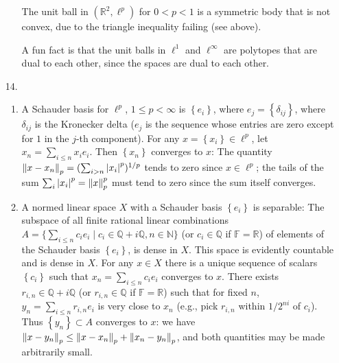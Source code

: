 \documentclass[11pt,leqno]{article}
\theoremstyle{plain}
\theoremstyle{definition}
\numberwithin{equation}{section}
\numberwithin{lem}{section}
\newcommand{\cbr}[1]{\left\{#1\right\}}
\begin{document}
\begin{enumerate}
\begin{enumerate}
    The unit ball in $(\mathbb R^2,\ell^p)$ for $0<p<1$ is a symmetric body that is not convex, due to the triangle inequality failing (see above).

    A fun fact is that the unit balls in $\ell^1$ and $\ell^\infty$ are polytopes that are dual to each other, since the spaces are dual to each other.
  \end{enumerate}\newpage
  
  \item[14.]
  \begin{enumerate}
      \item A Schauder basis for $\ell^p$, $1\leq p<\infty$ is $\cbr{e_i}$, where $e_j = \cbr{\delta_{ij}}$, where $\delta_{ij}$ is the Kronecker delta ($e_j$ is the sequence whose entries are zero except for $1$ in the $j$-th component). For any $x = \cbr{x_i}\in \ell^p$, let $x_n = \sum_{i\leq n} x_ie_i$. Then $\cbr{x_n}$ converges to $x$: The quantity $\norm{x-x_n}_p = (\sum_{i>n}\abs{x_i}^p)^{1/p}$ tends to zero since $x\in \ell^p$; the tails of the sum $\sum_i\abs{x_i}^p = \norm{x}_p^p$ must tend to zero since the sum itself converges.

      \item A normed linear space $X$ with a Schauder basis $\cbr{e_i}$ is separable: The subspace of all finite rational linear combinations $A = \{\sum_{i\leq n}c_ie_i\mid c_i\in \mathbb Q +i\mathbb Q, n\in \mathbb N\}$ (or $c_i\in \mathbb Q$ if $\mathbb F = \mathbb R$) of elements of the Schauder basis $\cbr{e_i}$, is dense in $X$. This space is evidently countable and is dense in $X$. For any $x \in X$ there is a unique sequence of scalars $\cbr{c_i}$ such that $x_n = \sum_{i\leq n} c_ie_i$ converges to $x$. There exists $r_{i,n}\in\mathbb Q + i\mathbb Q$ (or $r_{i,n}\in \mathbb Q$ if $\mathbb F = \mathbb R$) such that for fixed $n$, $y_n = \sum_{i\leq n}r_{i,n}e_i$ is very close to $x_n$ (e.g., pick $r_{i,n}$ within $1/2^{ni}$ of $c_i$). Thus $\cbr{y_n}\subset A$ converges to $x$: we have $\norm{x-y_n}_p\leq \norm{x-x_n}_p + \norm{x_n-y_n}_p$, and both quantities may be made arbitrarily small.
  \end{enumerate}
\end{enumerate}
\end{document}
